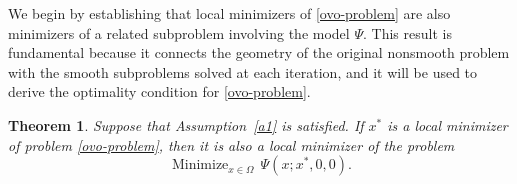 \documentclass[11pt]{article}
\newcommand{\minimize}{\mathop{\text{Minimize}}}
\newtheorem{theorem}{Theorem}[section]
\begin{document}
We begin by establishing that local minimizers of \eqref{ovo-problem} 
are also minimizers of a related subproblem involving the model 
$\Psi$. This result is fundamental because it connects the geometry 
of the original nonsmooth problem with the smooth subproblems solved 
at each iteration, and it will be used to derive the optimality 
condition for \eqref{ovo-problem}.

\begin{theorem} \label{teo:conv1}
Suppose that Assumption~\ref{a1} is satisfied. If $x^*$ is a local 
minimizer of problem \eqref{ovo-problem}, then it is also a local 
minimizer of the problem
\begin{equation} \label{ovo-problem-0}
    \minimize_{x \in \Omega}\, \Psi(x; x^*, 0, 0).
\end{equation}
\end{theorem}
\end{document}
